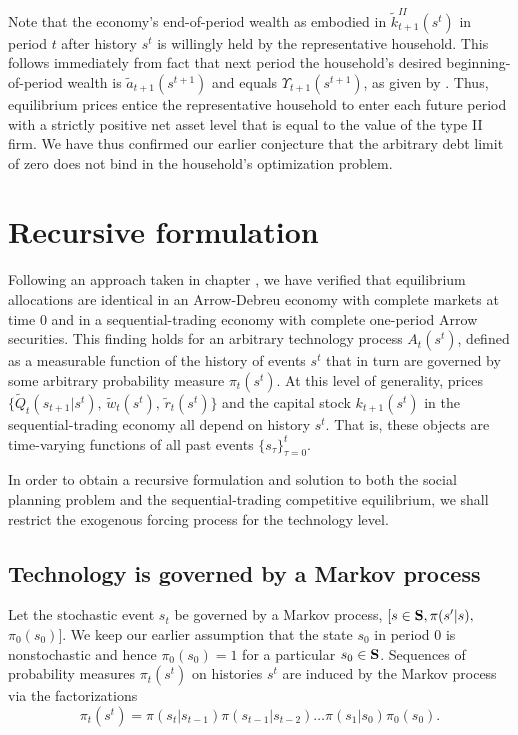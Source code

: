 Note that the economy's end-of-period wealth as embodied
in $\tilde k_{t+1}^{II}(s^t)$ in period $t$ after history $s^t$
is willingly held by the representative household. This follows
immediately from fact that next period the household's desired
beginning-of-period wealth  is 
$\tilde a_{t+1}(s^{t+1})$ and equals $\Upsilon_{t+1}(s^{t+1})$,
as given by . Thus,  equilibrium prices entice the
representative household to enter each future period with
a strictly positive net asset level that is equal to the value
of the type II firm. We have thus confirmed 
 our earlier conjecture that the arbitrary
debt limit of zero does not bind in the household's optimization
problem.






\section{Recursive formulation}
Following an approach taken in chapter ,
we have verified that 
equilibrium allocations are identical in an Arrow-Debreu
economy with complete markets at time $0$ and in a
sequential-trading economy with complete one-period
Arrow securities. This finding holds for an arbitrary
technology process $A_t(s^t)$, defined as a measurable
function of the history of events $s^t$ that in turn are
governed by some arbitrary probability measure $\pi_t(s^t)$.
At this level of generality,
 prices $\{\tilde Q_t(s_{t+1} | s^t),\, \tilde w_t(s^t),\,
\tilde r_t(s^t)\}$ and the capital stock $k_{t+1}(s^t)$
in the
sequential-trading economy all depend on  history $s^t$. That is,
these objects are time-varying functions of all past events
$\{s_\tau\}_{\tau=0}^t$.


In order to obtain a recursive formulation and solution to both the
social planning problem and the sequential-trading competitive equilibrium,
we shall restrict  the
exogenous forcing process for the technology level.




\subsection{Technology is governed by a Markov process}
Let the stochastic event $s_t$ be governed by a Markov process,
$[s\in {\bf S}, \pi(s'|s),$ $\pi_0(s_0)]$. We keep our earlier
assumption that the state $s_0$ in period 0 is
nonstochastic and hence $\pi_0(s_0)=1$ for a particular
$s_0\in{\bf S}$. Sequences of probability measures $\pi_t(s^t)$
on histories $s^t$ are induced by the Markov
process via the factorizations
$$ \pi_t(s^t) = \pi(s_t | s_{t-1}) \pi(s_{t-1} | s_{t-2}) \ldots
       \pi(s_1 | s_0)   \pi_0(s_0).  $$


